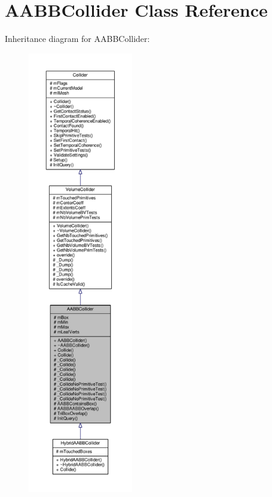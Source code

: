 \hypertarget{classAABBCollider}{}\section{A\+A\+B\+B\+Collider Class Reference}
\label{classAABBCollider}


Inheritance diagram for A\+A\+B\+B\+Collider\+:
\nopagebreak
\begin{figure}[H]
\begin{center}
\leavevmode
\includegraphics[height=550pt]{dc/d23/classAABBCollider__inherit__graph}
\end{center}
\end{figure}


